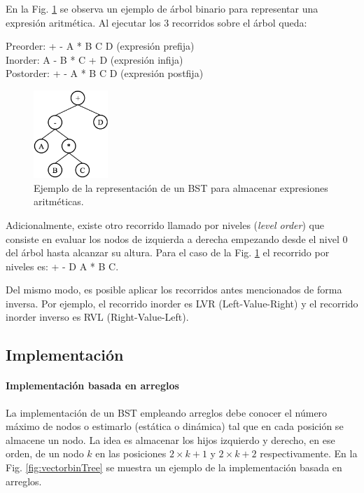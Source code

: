En la Fig. \ref{fig:bintreeExpresion} se observa un ejemplo de árbol binario para representar una expresión aritmética. Al ejecutar los 3 recorridos sobre el árbol queda:

Preorder: + - A * B C D (expresión prefija) \\
Inorder: A - B * C + D (expresión infija) \\
Postorder: + - A * B C D (expresión postfija) \\

\begin{figure}[htpb!]
  \begin{center}
    \includegraphics[width=0.25\textwidth]{images/bintreeExpresion.eps}
  \end{center}
  \caption{Ejemplo de la representación de un BST para almacenar expresiones aritméticas.}
  \label{fig:bintreeExpresion}
\end{figure}

Adicionalmente, existe otro recorrido llamado por niveles (\textit{level order}) que consiste en evaluar los nodos de izquierda a derecha empezando desde el nivel 0 del árbol hasta alcanzar su altura. Para el caso de la Fig. \ref{fig:bintreeExpresion} el recorrido por niveles es: + - D A * B C.

Del mismo modo, es posible aplicar los recorridos antes mencionados de forma inversa. Por ejemplo, el recorrido inorder es LVR (Left-Value-Right) y el recorrido inorder inverso es RVL (Right-Value-Left).


\subsection{Implementación}

\paragraph{Implementación basada en arreglos}

La implementación de un BST empleando arreglos debe conocer el número máximo de nodos o estimarlo (estática o dinámica) tal que en cada posición se almacene un nodo. La idea es almacenar los hijos izquierdo y derecho, en ese orden, de un nodo $k$ en las posiciones $2 \times k + 1$ y $2 \times k + 2$ respectivamente. En la Fig. \ref{fig:vectorbinTree} se muestra un ejemplo de la implementación basada en arreglos.

